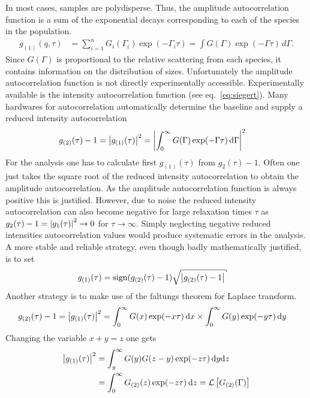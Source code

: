 In most cases, samples are polydisperse. Thus, the amplitude autocorrelation function is a sum of the exponential decays corresponding to each of the species in the population.
\begin{align}
    g_{(1)}(q,\tau) &= \sum_{i=1}^n G_i(\Gamma_i)\exp(-\Gamma_i\tau) = \int G(\Gamma)\exp(-\Gamma\tau)\,d\Gamma.
\end{align}
 Since $G(\Gamma)$ is proportional to the relative scattering from each species, it contains information on the distribution of sizes. Unfortunately the amplitude autocorrelation function is not directly experimentally accessible. Experimentally available is the intensity autocorrelation function (see eq.\ \ref{eq:siegert}). Many hardwares for autocorrelation automatically determine the baseline and supply a reduced intensity autocorrelation
 \begin{align}
 g_{(2)}(\tau)-1 &=\abs{g_{(1)}(\tau)}^2 = \abs{\int_0^\infty G(\Gamma) \exp(-\Gamma\tau)\,\mathrm{d}\Gamma}^2
 \end{align}
 For the analysis one has to calculate first $g_{(1)}(\tau)$ from $g_2(\tau)-1$. Often one just takes the square root of the reduced intensity autocorrelation to obtain the amplitude autocorrelation. As the amplitude autocorrelation function is always positive this is justified. However, due to noise the reduced intensity autocorrelation can also become negative for large relaxation times $\tau$ as $g_2(\tau)-1=\abs{g_1(\tau)}^2 \rightarrow 0$ for $\tau\rightarrow\infty$. Simply neglecting negative reduced intensities autocorrelation values would produce systematic errors in the analysis. A more stable and reliable strategy, even though badly mathematically justified, is to set
\begin{align}
\label{eq:sqrt_g2m1}
 g_{(1)}(\tau) &= \mathrm{sign}(g_{(2)}(\tau)-1) \sqrt{\abs{g_{(2)}(\tau)-1}}
\end{align}
Another strategy is to make use of the faltungs theorem for Laplace transform.
\begin{align}\label{eq:Lg2}
 g_{(2)}(\tau)-1 &=\abs{g_{(1)}(\tau)}^2 = \int_0^\infty G(x) \exp(-x\tau)\,\mathrm{d}x \times \int_0^\infty G(y) \exp(-y\tau)\,\mathrm{d}y
 \end{align}
 Changing the variable $x+y=z$ one gets
\begin{align}
 \abs{g_{(1)}(\tau)}^2 &= \int_y^\infty G(y) G(z-y)\exp(-z\tau)\,\mathrm{d}y\mathrm{d}z \\
                   &= \int_0^\infty G_{(2)}(z) \exp(-z\tau)\,\mathrm{d}z = \mathcal{L}\left[G_{(2)}(\Gamma)\right]
 \end{align}
